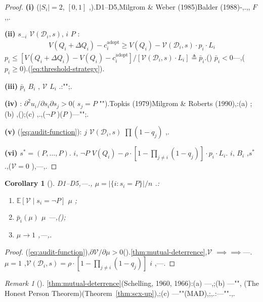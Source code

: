 \documentclass[12pt,a4paper]{article}
\newtheorem{corollary}[theorem]{Corollary}
\theoremstyle{definition}
\theoremstyle{remark}
\newtheorem{remark}{Remark}[section]
\begin{document}
\begin{proof}
\textbf{(i)} ($|S_i| = 2$, $[0,1]$ ,).D1--D5,Milgrom \& Weber (1985)Balder (1988)-,.,, $F$ ,,.

\textbf{(ii)}  $s_{-i}$  $\mathcal{V}(\mathcal{D}_i, s)$, $i$  $P$ :
\begin{align}
V(Q_i + \Delta Q_i) - c_i^{\text{adopt}} \geq V(Q_i) - \mathcal{V}(\mathcal{D}_i, s) \cdot p_i \cdot L_i
\end{align}
 $p_i \leq [V(Q_i + \Delta Q_i) - V(Q_i) - c_i^{\text{adopt}}] / [\mathcal{V}(\mathcal{D}_i, s) \cdot L_i] \triangleq \bar{p}_i$.() $\bar{p}_i < 0$---,($p_i \geq 0$).(\ref{eq:threshold-strategy}).

\textbf{(iii)} $\bar{p}_i$  $B_i$ , $\mathcal{V}$  $L_i$ .:"";.

\textbf{(iv)} : $\partial^2 u_i / \partial s_i \partial s_j > 0$( $s_j = P$ "").Topkis (1979)Milgrom \& Roberts (1990),:(a) ;(b) ,();(c) ,.,($\neg P$ )($P$ )---"";.

\textbf{(v)} (\ref{eq:audit-function}): $j$  $\mathcal{V}(\mathcal{D}_i, s)$  $\prod (1 - q_j)$ ,.

\textbf{(vi)}  $s^* = (P, \ldots, P)$. $i$, $\neg P$  $V(Q_i) - \rho \cdot [1 - \prod_{j \neq i} (1 - q_j)] \cdot p_i \cdot L_i$. $i$, $B_i$ ,$s^*$ .,($\mathcal{V} = 0$ ),---,.
\end{proof}

\begin{corollary}[]
\label{cor:deterrence-efficiency}
D1--D5,---., $\mu = |\{i: s_i = P\}| / n$ .:
\begin{enumerate}[label=(\roman*)]
\item  $\mathbb{E}[\mathcal{V} \mid s_i = \neg P]$  $\mu$ ;
\item  $\bar{p}_i(\mu)$  $\mu$ ---,();
\item  $\mu \to 1$ ,---,.
\end{enumerate}
\end{corollary}

\begin{proof}
(\ref{eq:audit-function}),$\partial \mathcal{V} / \partial \mu > 0$().\ref{thm:mutual-deterrence},$\mathcal{V}$ $\implies$$\implies$---. $\mu = 1$ ,$\mathcal{V}(\mathcal{D}_i, s) = \rho \cdot [1 - \prod_{j \neq i} (1 - q_j)]$  $i$ ,---.
\end{proof}

\begin{remark}[]
\ref{thm:mutual-deterrence}(Schelling, 1960, 1966):(a) \textit{}\textit{}---,;(b) \textit{}---"", (The Honest Person Theorem)(Theorem~\ref{thm:scx-up}),;(c) ---""(MAD),;,.:\textit{}---"".,.
\end{remark}
\end{document}
